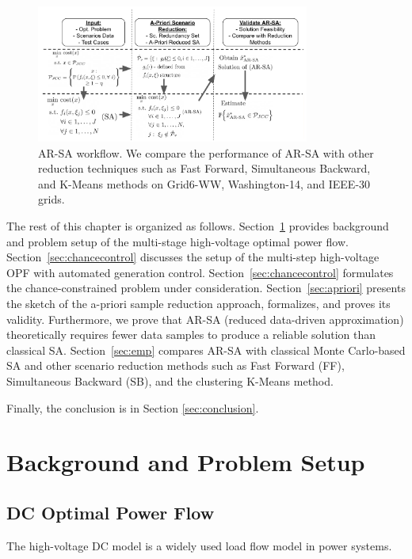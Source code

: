 \begin{figure}
    \centering
    \hspace{-2mm}\includegraphics[width=0.8\textwidth]{Dissertation/images/dynamic//scheme.png}
    \caption{AR-SA workflow. We compare the performance of AR-SA with other reduction techniques such as Fast Forward, Simultaneous Backward, and K-Means methods on Grid6-WW, Washington-14, and IEEE-30 grids.}
    \label{fig:workflow}
    \vspace{-1mm}
\end{figure}

The rest of this chapter is organized as follows. Section~\ref{sec:setup} provides background and problem setup of the multi-stage high-voltage optimal power flow. Section~\ref{sec:chancecontrol} discusses the setup of the multi-step high-voltage OPF with automated generation control. Section~\ref{sec:chancecontrol} formulates the chance-constrained problem under consideration. Section~\ref{sec:apriori} presents the sketch of the a-priori sample reduction approach, formalizes, and proves its validity. Furthermore, we prove that AR-SA (reduced data-driven approximation) theoretically requires fewer data samples to produce a reliable solution than classical SA. Section~\ref{sec:emp} compares AR-SA with classical Monte Carlo-based SA and other scenario reduction methods such as Fast Forward (FF), Simultaneous Backward (SB), and the clustering K-Means method.

Finally, the conclusion is in Section \ref{sec:conclusion}.
\section{Background and Problem Setup}\label{sec:setup}
\subsection{DC Optimal Power Flow}
The high-voltage DC model is a widely used load flow model in power systems. 

